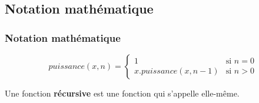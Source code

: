 \documentclass[svgnames,11pt]{beamer}
\begin{document}
\subsection{Notation mathématique}
\begin{frame}
    \frametitle{Notation mathématique}

    $$
    puissance(x,n) = \left\{
        \begin{array}{ll}
            1 & \mbox{si } n=0 \\
            x.puissance(x,n-1) & \mbox{si } n>0
        \end{array}
    \right.
    $$
\begin{aretenir}[]
Une fonction \textbf{récursive} est une fonction qui s'appelle elle-même.
\end{aretenir}   
\end{frame}
\end{document}

